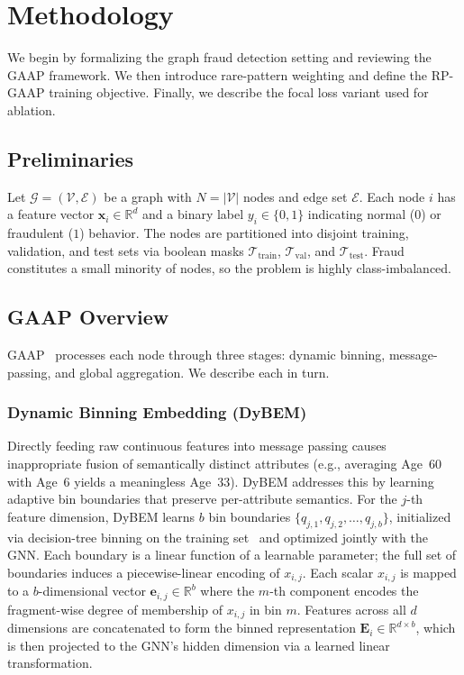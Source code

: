 \section{Methodology}
\label{sec:methodology}

We begin by formalizing the graph fraud detection setting and reviewing the GAAP framework. We then introduce rare-pattern weighting and define the RP-GAAP training objective. Finally, we describe the focal loss variant used for ablation.

\subsection{Preliminaries}

Let $\mathcal{G} = (\mathcal{V}, \mathcal{E})$ be a graph with $N = |\mathcal{V}|$ nodes and edge set $\mathcal{E}$. Each node $i$ has a feature vector $\mathbf{x}_i \in \mathbb{R}^d$ and a binary label $y_i \in \{0, 1\}$ indicating normal ($0$) or fraudulent ($1$) behavior. The nodes are partitioned into disjoint training, validation, and test sets via boolean masks $\mathcal{T}_{\text{train}}$, $\mathcal{T}_{\text{val}}$, and $\mathcal{T}_{\text{test}}$. Fraud constitutes a small minority of nodes, so the problem is highly class-imbalanced.

\subsection{GAAP Overview}

GAAP~\cite{duan2025global} processes each node through three stages: dynamic binning, message-passing, and global aggregation. We describe each in turn.

\subsubsection{Dynamic Binning Embedding (DyBEM)}

Directly feeding raw continuous features into message passing causes inappropriate fusion of semantically distinct attributes (e.g., averaging Age~60 with Age~6 yields a meaningless Age~33). DyBEM addresses this by learning adaptive bin boundaries that preserve per-attribute semantics. For the $j$-th feature dimension, DyBEM learns $b$ bin boundaries $\{q_{j,1}, q_{j,2}, \dots, q_{j,b}\}$, initialized via decision-tree binning on the training set~\cite{duan2025global} and optimized jointly with the GNN. Each boundary is a linear function of a learnable parameter; the full set of boundaries induces a piecewise-linear encoding of $x_{i,j}$. Each scalar $x_{i,j}$ is mapped to a $b$-dimensional vector $\mathbf{e}_{i,j} \in \mathbb{R}^{b}$ where the $m$-th component encodes the fragment-wise degree of membership of $x_{i,j}$ in bin $m$. Features across all $d$ dimensions are concatenated to form the binned representation $\mathbf{E}_i \in \mathbb{R}^{d \times b}$, which is then projected to the GNN's hidden dimension via a learned linear transformation.

